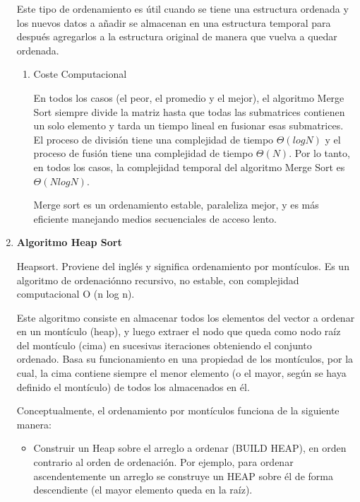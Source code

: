 \documentclass{article}
\begin{document}
\begin{enumerate}
    
            Este tipo de ordenamiento es útil cuando se tiene una estructura ordenada y los nuevos datos a añadir se almacenan en una estructura temporal para después agregarlos a la estructura original de manera que vuelva a quedar ordenada.
        
    
    
        \begin{enumerate}
            \item {Coste Computacional}
                    
                    En todos los casos (el peor, el promedio y el mejor), el algoritmo Merge Sort siempre divide la matriz hasta que todas las submatrices contienen un solo elemento y tarda un tiempo lineal en fusionar esas submatrices. El proceso de división tiene una complejidad de tiempo $\Theta (logN)$ y el proceso de fusión tiene una complejidad de tiempo $\Theta (N)$. Por lo tanto, en todos los casos, la complejidad temporal del algoritmo Merge Sort es $\Theta(NlogN)$.

                    
                    Merge sort es un ordenamiento estable, paraleliza mejor, y es más eficiente manejando medios secuenciales de acceso lento. 
            
        \end{enumerate}

	
\item \textbf{Algoritmo Heap Sort}

        Heapsort. Proviene del inglés y significa ordenamiento por montículos. Es un algoritmo de ordenaciónno recursivo, no estable, con complejidad computacional O (n log n).
		
        Este algoritmo consiste en almacenar todos los elementos del vector a ordenar en un montículo (heap), y luego extraer el nodo que queda como nodo raíz del montículo (cima) en sucesivas iteraciones obteniendo el conjunto ordenado. Basa su funcionamiento en una propiedad de los montículos, por la cual, la cima contiene siempre el menor elemento (o el mayor, según se haya definido el montículo) de todos los almacenados en él.
        
        Conceptualmente, el ordenamiento por montículos funciona de la siguiente manera:
        
        \begin{itemize}
            \item Construir un Heap sobre el arreglo a ordenar (BUILD HEAP), en orden contrario 
            al orden de ordenación. Por ejemplo, para ordenar ascendentemente un arreglo se 
            construye un HEAP sobre él de forma descendiente (el mayor elemento queda en la raíz).


\end{itemize}
\end{enumerate}
\end{document}
